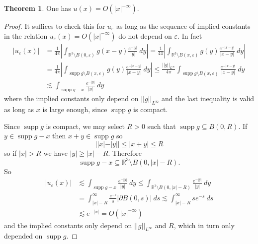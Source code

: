 \documentclass[10pt]{article}
\newcommand{\RR}{\mathbb{R}}
\newcommand{\supp}{\operatorname{supp}}
\theoremstyle{definition}
\newtheorem{theorem}[lemma]{Theorem}
\begin{document}
\begin{theorem}
One has $u(x) = O(|x|^{-\infty})$.
\end{theorem}
\begin{proof}
It suffices to check this for $u_\varepsilon$ as long as the sequence of implied constants in the relation $u_\varepsilon(x) = O(|x|^{-\infty})$ do not depend on $\varepsilon$.
In fact
\begin{align*}
|u_\varepsilon(x)| &= \frac{1}{4\pi} \left|\int_{\RR^3 \setminus B(0, \varepsilon)} g(x - y) \frac{e^{-|y|}}{|y|}~dy\right| = \frac{1}{4\pi} \left|\int_{\RR^3 \setminus B(x, \varepsilon)} g(y) \frac{e^{-|x - y|}}{|x - y|}~dy\right| \\
&= \frac{1}{4\pi} \left|\int_{\supp g \setminus B(x, \varepsilon)} g(y) \frac{e^{-|x - y|}}{|x - y|}~dy\right|
\leq \frac{||g||_{L^\infty}}{4\pi} \int_{\supp g \setminus B(x, \varepsilon)}  \frac{e^{-|x - y|}}{|x - y|}~dy\\
&\lesssim \int_{\supp g-x} \frac{e^{-|y|}}{|y|}~dy
\end{align*}
where the implied constants only depend on $||g||_{L^\infty}$ and the last inequality is valid as long as $x$ is large enough, since $\supp g$ is compact.

Since $\supp g$ is compact, we may select $R > 0$ such that $\supp g \subseteq B(0, R)$.
If $y \in \supp g - x$ then $x + y \in \supp g$ so
$$||x| - |y|| \leq |x + y| \leq R$$
so if $|x| > R$ we have $|y| \geq |x| - R$. Therefore
$$\supp g -x \subseteq \RR^3 \setminus B(0, |x| - R).$$
So
\begin{align*}
|u_\varepsilon(x)| &\lesssim \int_{\supp g-x} \frac{e^{-|y|}}{|y|}~dy \leq \int_{\RR^3 \setminus B(0, |x| - R)} \frac{e^{-|y|}}{|y|}~dy\\
&= \int_{|x|-R}^\infty \frac{e^{-s}}{s} |\partial B(0, s)|~ds \lesssim \int_{|x|-R}^\infty se^{-s}~ds \\
&\lesssim e^{-|x|} = O(|x|^{-\infty})
\end{align*}
and the implied constants only depend on $||g||_{L^\infty}$ and $R$, which in turn only depended on $\supp g$.
\end{proof}
\end{document}
